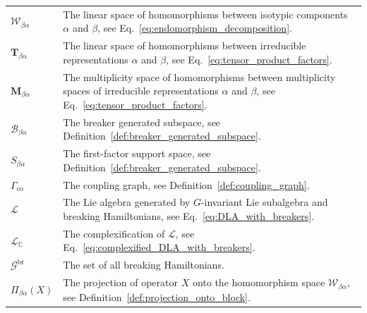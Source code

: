\documentclass[11pt,letterpaper]{article}
\newcounter{alg}
\theoremstyle{plain}
\theoremstyle{plain}
\theoremstyle{plain}
\theoremstyle{plain}
\theoremstyle{plain}
\theoremstyle{plain}
\newcommand{\C}{\mathbb{C}}
\theoremstyle{plain}
\theoremstyle{definition}
\theoremstyle{plain}
\begin{document}
\begin{tabular}{@{}ll@{}}

\parbox[t]{0.22\textwidth}{$\mathcal{W}_{\beta \alpha}$} & \parbox[t]{0.72\textwidth}{The linear space of homomorphisms between isotypic components $\alpha$ and $\beta$, see Eq.~\eqref{eq:endomorphism_decomposition}.} \\[0.6em]

\parbox[t]{0.22\textwidth}{$\mathbf{T}_{\beta \alpha}$} & \parbox[t]{0.72\textwidth}{The linear space of homomorphisms between irreducible representations $\alpha$ and $\beta$, see Eq.~\eqref{eq:tensor_product_factors}.} \\[0.6em]

\parbox[t]{0.22\textwidth}{$\mathbf{M}_{\beta \alpha}$} & \parbox[t]{0.72\textwidth}{The multiplicity space of homomorphisms between multiplicity spaces of irreducible representations $\alpha$ and $\beta$, see Eq.~\eqref{eq:tensor_product_factors}.} \\[0.6em]

\parbox[t]{0.22\textwidth}{$\mathcal{B}_{\beta \alpha}$} & \parbox[t]{0.72\textwidth}{The breaker generated subspace, see Definition~\ref{def:breaker_generated_subspace}.} \\[0.6em]

\parbox[t]{0.22\textwidth}{$S_{\beta \alpha}$} & \parbox[t]{0.72\textwidth}{The first-factor support space, see Definition~\ref{def:breaker_generated_subspace}.} \\[0.6em]

\parbox[t]{0.22\textwidth}{$\Gamma_{\mathrm{co}}$} & \parbox[t]{0.72\textwidth}{The coupling graph, see Definition~\ref{def:coupling_graph}.} \\[0.6em]

\parbox[t]{0.22\textwidth}{$\mathcal{L}$} & \parbox[t]{0.72\textwidth}{The Lie algebra generated by $G$-invariant Lie subalgebra and breaking Hamiltonians, see Eq.~\eqref{eq:DLA_with_breakers}.} \\[0.6em]

\parbox[t]{0.22\textwidth}{$\mathcal{L}_{\C}$} & \parbox[t]{0.72\textwidth}{The complexification of $\mathcal{L}$, see Eq.~\eqref{eq:complexified_DLA_with_breakers}.} \\[0.6em]

\parbox[t]{0.22\textwidth}{$\mathcal{G}^{\text {br }}$} & \parbox[t]{0.72\textwidth}{The set of all breaking Hamiltonians.} \\[0.6em]

\parbox[t]{0.22\textwidth}{$\Pi_{\beta \alpha}(X)$} & \parbox[t]{0.72\textwidth}{The projection of operator $X$ onto the homomorphism space $\mathcal{W}_{\beta \alpha}$, see Definition~\ref{def:projection_onto_block}.} \\[0.6em]

\end{tabular}
\end{document}
